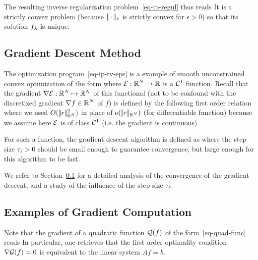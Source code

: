 The resulting inverse  regularization problem~\eqref{eq-ip-regul} thus reads 
It is a strictly convex problem (because $|\!| \cdot |\!|_\varepsilon$ is strictly convex for $\epsilon>0$) so that its solution $f_\lambda$ is unique. 



\subsection{Gradient Descent Method}
\label{sec-grad-descent}

The optimization program~\eqref{eq-ip-tv-eps} is a example of smooth unconstrained convex optimization of the form
where $\mathcal{E} : \mathbb{R}^N \rightarrow \mathbb{R}$ is a $\mathcal{C}^1$ function. Recall that the gradient $\nabla \mathcal{E} : \mathbb{R}^N \mapsto \mathbb{R}^N$ of this functional (not to be confound with the discretized gradient $\nabla f \in \mathbb{R}^N$ of $f$) is defined by the following first order relation
where we used $O(|\!| r |\!|_{\mathbb{R}^N}^2)$ in place of $o(|\!| r |\!|_{\mathbb{R}^N})$ (for differentiable function) because we assume here $\mathcal{E}$ is of class $\mathcal{C}^1$ (i.e. the gradient is continuous). 

For such a function, the gradient descent algorithm is defined as
where the step size $\tau_\ell>0$ should be small enough to guarantee convergence, but large enough for this algorithm to be fast.

We refer to Section~\ref{sec-grad-descent} for a detailed analysis of the convergence of the gradient descent, and a study of the influence of the step size $\tau_\ell$.



\subsection{Examples of Gradient Computation}
\label{eq-example-grad}

Note that the gradient of a quadratic function $\mathcal{Q}(f)$ of the form~\eqref{eq-quad-func} reads
In particular, one retrieves that the first order optimality condition $\nabla \mathcal{G}(f)=0$ is equivalent to the linear system $Af=b$. 

